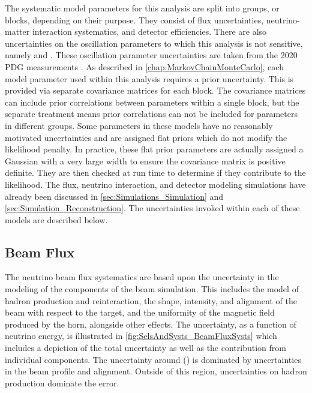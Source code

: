 The systematic model parameters for this analysis are split into groups, or blocks, depending on their purpose. They consist of flux uncertainties, neutrino-matter interaction systematics, and detector efficiencies. There are also uncertainties on the oscillation parameters to which this analysis is not sensitive, namely  and . These oscillation parameter uncertainties are taken from the 2020 PDG measurements \cite{Particle_Data_Group2020-ms}. As described in \autoref{chap:MarkovChainMonteCarlo}, each model parameter used within this analysis requires a prior uncertainty. This is provided via separate covariance matrices for each block. The covariance matrices can include prior correlations between parameters within a single block, but the separate treatment means prior correlations can not be included for parameters in different groups. Some parameters in these models have no reasonably motivated uncertainties and are assigned flat priors which do not modify the likelihood penalty. In practice, these flat prior parameters are actually assigned a Gaussian with a very large width to ensure the covariance matrix is positive definite. They are then checked at run time to determine if they contribute to the likelihood. The flux, neutrino interaction, and detector modeling simulations have already been discussed in \autoref{sec:Simulations_Simulation} and \autoref{sec:Simulation_Reconstruction}. The uncertainties invoked within each of these models are described below.

\subsection{Beam Flux}
\label{sec:SelsAndSysts_Systs_BeamFlux}

The neutrino beam flux systematics are based upon the uncertainty in the modeling of the components of the beam simulation. This includes the model of hadron production and reinteraction, the shape, intensity, and alignment of the beam with respect to the target, and the uniformity of the magnetic field produced by the horn, alongside other effects. The uncertainty, as a function of neutrino energy, is illustrated in \autoref{fig:SelsAndSysts_BeamFluxSysts} which includes a depiction of the total uncertainty as well as the contribution from individual components. The uncertainty around () is dominated by uncertainties in the beam profile and alignment. Outside of this region, uncertainties on hadron production dominate the error.


